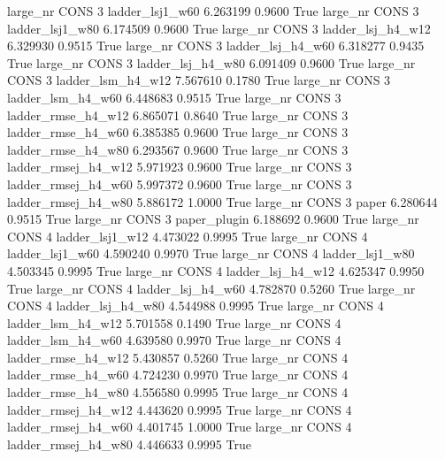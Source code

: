   large_nr     CONS                 3     ladder_lsj1_w60    6.263199      0.9600    True
  large_nr     CONS                 3     ladder_lsj1_w80    6.174509      0.9600    True
  large_nr     CONS                 3   ladder_lsj_h4_w12    6.329930      0.9515    True
  large_nr     CONS                 3   ladder_lsj_h4_w60    6.318277      0.9435    True
  large_nr     CONS                 3   ladder_lsj_h4_w80    6.091409      0.9600    True
  large_nr     CONS                 3   ladder_lsm_h4_w12    7.567610      0.1780    True
  large_nr     CONS                 3   ladder_lsm_h4_w60    6.448683      0.9515    True
  large_nr     CONS                 3  ladder_rmse_h4_w12    6.865071      0.8640    True
  large_nr     CONS                 3  ladder_rmse_h4_w60    6.385385      0.9600    True
  large_nr     CONS                 3  ladder_rmse_h4_w80    6.293567      0.9600    True
  large_nr     CONS                 3 ladder_rmsej_h4_w12    5.971923      0.9600    True
  large_nr     CONS                 3 ladder_rmsej_h4_w60    5.997372      0.9600    True
  large_nr     CONS                 3 ladder_rmsej_h4_w80    5.886172      1.0000    True
  large_nr     CONS                 3               paper    6.280644      0.9515    True
  large_nr     CONS                 3        paper_plugin    6.188692      0.9600    True
  large_nr     CONS                 4     ladder_lsj1_w12    4.473022      0.9995    True
  large_nr     CONS                 4     ladder_lsj1_w60    4.590240      0.9970    True
  large_nr     CONS                 4     ladder_lsj1_w80    4.503345      0.9995    True
  large_nr     CONS                 4   ladder_lsj_h4_w12    4.625347      0.9950    True
  large_nr     CONS                 4   ladder_lsj_h4_w60    4.782870      0.5260    True
  large_nr     CONS                 4   ladder_lsj_h4_w80    4.544988      0.9995    True
  large_nr     CONS                 4   ladder_lsm_h4_w12    5.701558      0.1490    True
  large_nr     CONS                 4   ladder_lsm_h4_w60    4.639580      0.9970    True
  large_nr     CONS                 4  ladder_rmse_h4_w12    5.430857      0.5260    True
  large_nr     CONS                 4  ladder_rmse_h4_w60    4.724230      0.9970    True
  large_nr     CONS                 4  ladder_rmse_h4_w80    4.556580      0.9995    True
  large_nr     CONS                 4 ladder_rmsej_h4_w12    4.443620      0.9995    True
  large_nr     CONS                 4 ladder_rmsej_h4_w60    4.401745      1.0000    True
  large_nr     CONS                 4 ladder_rmsej_h4_w80    4.446633      0.9995    True
